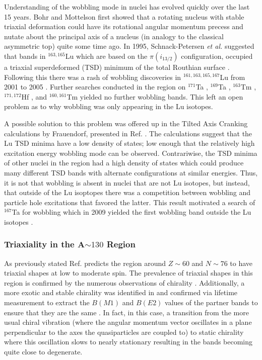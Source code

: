Understanding of the wobbling mode in nuclei has evolved quickly over the last 15 years. Bohr and Mottelson first showed that a rotating nucleus with stable triaxial deformation could have its rotational angular momentum precess and nutate about the principal axis of a nucleus \cite{bohrMottelson2} (in analogy to the classical asymmetric top) quite some time ago. In 1995, Schnack-Petersen \emph{et al.} suggested that bands in $^{163,165}$Lu which are based on the $\pi{}(i_{13/2})$ configuration, occupied a triaxial superdeformed (TSD) minimum of the total Routhian surface \cite{tsdLutetium}. Following this there was a rash of wobbling discoveries in $^{161,163,165,167}$Lu from 2001 to 2005 \cite{wobblingIn163Lu,wobblingIn163LuTwoPhonon,wobblingIn165Lu,wobblingIn167Lu,wobblingIn161Lu}. Further searches conducted in the region on $^{171}$Ta \cite{wobbSearch171Ta}, $^{169}$Ta \cite{wobbSearch169Ta}, $^{163}$Tm \cite{wobbSearch163Tm}, $^{171,172}$Hf \cite{wobbSearch1712Hf}, and $^{160,161}$Tm \cite{wobbSearch1601Tm} yielded no further wobbling bands. This left an open problem as to why wobbling was only appearing in the Lu isotopes.

A possible solution to this problem was offered up in the Tilted Axis Cranking calculations by Frauendorf, presented in Ref. \cite{wobbSearch163Tm}. The calculations suggest that the Lu TSD minima have a low density of states; low enough that the relatively high excitation energy wobbling mode can be observed. Contrariwise, the TSD minima of other nuclei in the region had a high density of states which could produce many different TSD bands with alternate configurations at similar energies. Thus, it is not that wobbling is absent in nuclei that are not Lu isotopes, but instead, that outside of the Lu isoptopes there was a competition between wobbling and particle hole excitations that favored the latter. This result motivated a search of $^{167}$Ta for wobbling which in 2009 yielded the first wobbling band outside the Lu isotopes \cite{wobblingIn167Ta}.

\subsubsection{Triaxiality in the A$\sim{}130$ Region}
\label{sec:trw-triax}
As previously stated Ref. \cite{groundStateTriax} predicts the region around $Z\sim{}60$ and $N\sim{}76$ to have triaxial shapes at low to moderate spin. The prevalence of triaxial shapes in this region is confirmed by the numerous observations of chirality \cite{chiralityIn134Pr,chiralityA130Region,chiralityUpperA130Region,chiralityA130Region2,chirality136Pm,chiralityMore135Nd,chiralityIn135Nd,chiralityMulti133Cs}. Additionally, a more exotic and stable chirality was identified in \cite{chiralityMore135Nd,chiralityIn135Nd} and confirmed via lifetime measurement to extract the $B(M1)$ and $B(E2)$ values of the partner bands to ensure that they are the same \cite{chiralityIn135Nd}. In fact, in this case, a transition from the more usual chiral vibration (where the angular momentum vector oscillates in a plane perpendicular to the axes the quasiparticles are coupled to) to static chirality where this oscillation slows to nearly stationary resulting in the bands becoming quite close to degenerate.

